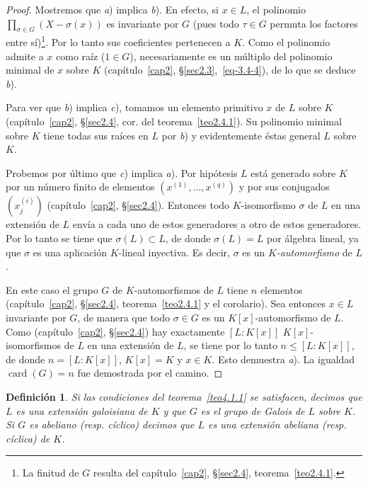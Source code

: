 \documentclass[10pt,oneside,bibtotoc,smallheadings,leqno,a5paper,DIV=12]{scrbook}
\newcommand{\QED}{}%
\DeclareMathOperator{\card}{card}
\numberwithin{equation}{section}
\theoremstyle{defi}
\newtheorem{definition}{Definici\'on}
\theoremstyle{enonce}
\theoremstyle{rem}
\numberwithin{theorem}{section}
\numberwithin{proposition}{section}
\numberwithin{definition}{section}
\numberwithin{lemma}{section}
\numberwithin{corollary}{section}
\numberwithin{example}{section}
\numberwithin{footnote}{section}%
\begin{document}
\begin{proof}
Mostremos que {\itshape a}) implica {\itshape b}). En efecto, si $x\in L$, el polinomio
$\prod_{\sigma\in G}(X-\sigma(x))$ es invariante por $G$ (pues todo $\tau\in G$ permuta los factores
entre s\'i)\footnote{La finitud de $G$ resulta del cap\'itulo~\ref{cap2}, \S\ref{sec2.4}, teorema~\ref{teo2.4.1}.}. Por lo tanto
sus coeficientes pertenecen a $K$. Como el polinomio admite a $x$ como ra\'iz ($1\in G$), necesariamente
es un m\'ultiplo del polinomio minimal de $x$ sobre $K$ (cap\'itulo~\ref{cap2}, \S\ref{sec2.3},~\eqref{eq-3.4-4}), de
lo que se deduce {\itshape b}).

Para ver que \textit{b}) implica {\itshape c}), tomamos un elemento primitivo $x$ de $L$ sobre $K$
(cap\'itulo~\ref{cap2}, \S\ref{sec2.4}, cor. del teorema~\ref{teo2.4.1}). Su polinomio minimal sobre $K$ tiene todas sus ra\'ices en
$L$ por {\itshape b}) y evidentemente \'estas general $L$ sobre $K$.

Probemos por \'ultimo que {\itshape c}) implica {\itshape a}). Por hip\'otesis $L$ est\'a generado sobre $K$
por un n\'umero finito de elementos $(x^{(1)},\dots,x^{(q)})$ y por sus conjugados $(x_{j}^{(i)})$
(cap\'itulo~\ref{cap2}, \S\ref{sec2.4}). Entonces todo $K$-isomorfismo $\sigma$ de $L$ en una extensi\'on de $L$
env\'ia a cada uno de estos generadores a otro de estos generadores. Por lo tanto se tiene que $\sigma(L)\subset L$,
de donde $\sigma(L) =L$ por \'algebra lineal, ya que $\sigma$ es una aplicaci\'on $K$-lineal inyectiva. Es decir,
$\sigma$ es un {\em $K$-automorfismo} de $L$.

En este caso el grupo $G$ de $K$-automorfismos de $L$ tiene $n$ elementos (cap\'itulo~\ref{cap2}, \S\ref{sec2.4}, teorema~\ref{teo2.4.1} y
el corolario). Sea entonces $x\in L$ invariante por $G$, de manera que todo $\sigma\in G$ es un $K[x]$-automorfismo
de $L$. Como (cap\'itulo~\ref{cap2}, \S\ref{sec2.4}) hay exactamente $[L:K[x]]$ $K[x]$-isomorfismos de $L$ en una
extensi\'on de $L$, se tiene por lo tanto $n\leq[L:K[x]]$, de donde $n=[L:K[x]]$, $K[x] = K$ y
$x\in K$. Esto demuestra {\itshape a}). La igualdad $\card(G) = n$ fue demostrada por el camino. \QED
\end{proof}

\begin{definition}
Si las condiciones del teorema~\ref{teo4.1.1} se satisfacen, decimos que $L$ es una extensi\'on galoisiana de $K$ y que
$G$ es el grupo de Galois de $L$ sobre $K$. Si $G$ es abeliano (resp. c\'iclico) decimos que $L$ es una
extensi\'on abeliana (resp. c\'iclica) de $K$.
\end{definition}
\end{document}
